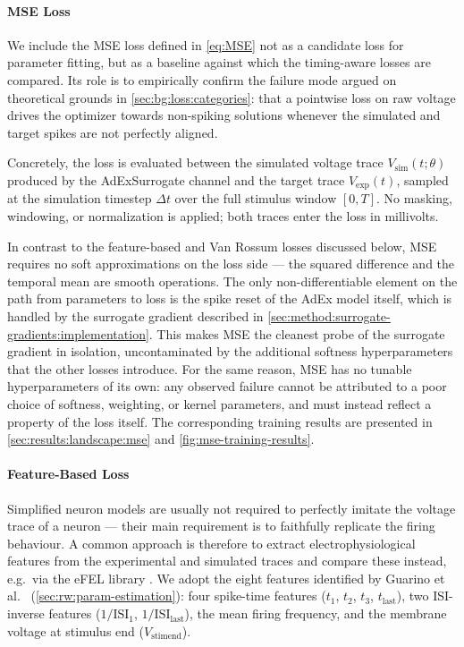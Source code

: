\paragraph{MSE Loss}\label{sec:method:opt:loss:mse-loss}
We include the \gls{MSE} loss defined in \cref{eq:MSE} not as a candidate loss for parameter fitting,
but as a baseline against which the timing-aware losses are compared.
Its role is to empirically confirm the failure mode argued on theoretical grounds in \cref{sec:bg:loss:categories}:
that a pointwise loss on raw voltage drives the optimizer towards non-spiking solutions whenever the simulated and target spikes are not perfectly aligned.

Concretely, the loss is evaluated between the simulated voltage trace $V_{\text{sim}}(t; \theta)$ produced by the AdExSurrogate channel and the target trace $V_{\text{exp}}(t)$,
sampled at the simulation timestep $\Delta t$ over the full stimulus window $[0, T]$.
No masking, windowing, or normalization is applied; both traces enter the loss in millivolts.

In contrast to the feature-based and Van Rossum losses discussed below, \gls{MSE} requires no soft approximations on the loss side ---
the squared difference and the temporal mean are smooth operations.
The only non-differentiable element on the path from parameters to loss is the spike reset of the AdEx model itself,
which is handled by the surrogate gradient described in \cref{sec:method:surrogate-gradients:implementation}.
This makes \gls{MSE} the cleanest probe of the surrogate gradient in isolation,
uncontaminated by the additional softness hyperparameters that the other losses introduce.
For the same reason, \gls{MSE} has no tunable hyperparameters of its own:
any observed failure cannot be attributed to a poor choice of softness, weighting, or kernel parameters,
and must instead reflect a property of the loss itself.
The corresponding training results are presented in \cref{sec:results:landscape:mse} and \cref{fig:mse-training-results}.

\paragraph{Feature-Based Loss}\label{sec:method:opt:loss:feature-loss}
Simplified neuron models are usually not required to perfectly imitate the voltage trace of a neuron --- their main requirement is to faithfully replicate the firing behaviour.
A common approach is therefore to extract electrophysiological features from the experimental and simulated traces and compare these instead, e.g.\ via the eFEL library \cite{VanGeit2024}.
We adopt the eight features identified by Guarino et al.~\cite{Guarino2025} (\cref{sec:rw:param-estimation}): four spike-time features ($t_1$, $t_2$, $t_3$, $t_{\text{last}}$), two ISI-inverse features ($1/\text{ISI}_1$, $1/\text{ISI}_{\text{last}}$), the mean firing frequency, and the membrane voltage at stimulus end ($V_{\text{stimend}}$).

